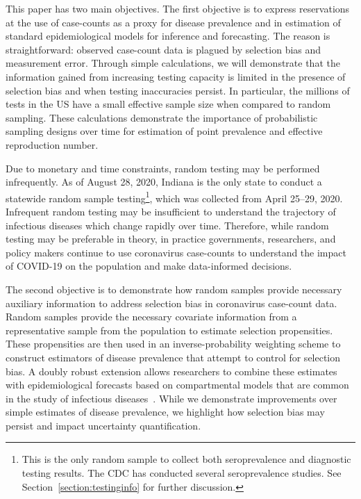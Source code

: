 \documentclass[11pt]{amsart}
\begin{document}
This paper has two main objectives.  The first objective is to express reservations at the use of case-counts as a proxy for disease prevalence and in estimation of standard epidemiological models for inference and forecasting.  The reason is straightforward: observed case-count data is plagued by selection bias and measurement error. Through simple calculations, we will demonstrate that the information gained from increasing testing capacity is limited in the presence of selection bias and when testing inaccuracies persist.  In particular, the millions of tests in the US have a small effective sample size when compared to random sampling. These calculations demonstrate the importance of probabilistic sampling designs  over time for estimation of point prevalence and effective reproduction number.

Due to monetary and time constraints, random testing may be performed infrequently.  As of August 28, 2020, Indiana is the only state to conduct a statewide random sample testing\footnote{This is the only random sample to collect both seroprevalence and diagnostic testing results. The CDC has conducted several seroprevalence studies. See Section~\ref{section:testinginfo} for further discussion.}, which was collected from April 25--29, 2020.  Infrequent random testing may be insufficient to understand the trajectory of infectious diseases which change rapidly over time.  Therefore, while random testing may be preferable in theory, in practice governments, researchers, and policy makers continue to use coronavirus case-counts to understand the impact of COVID-19 on the population and make data-informed decisions.

The second objective is to demonstrate how random samples provide necessary auxiliary information to address selection bias in coronavirus case-count data.  Random samples provide the necessary covariate information from a representative sample from the population to estimate selection propensities. These propensities are then used in an inverse-probability weighting scheme to construct estimators of disease prevalence that attempt to control for selection bias.  A doubly robust extension allows researchers to combine these estimates with epidemiological forecasts based on compartmental models that are common in the study of infectious diseases~\cite{Hao2020,Song2020,Ray2020,Johndrow2020}.  While we demonstrate improvements over simple estimates of disease prevalence, we highlight how selection bias may persist and impact uncertainty quantification.
\end{document}
